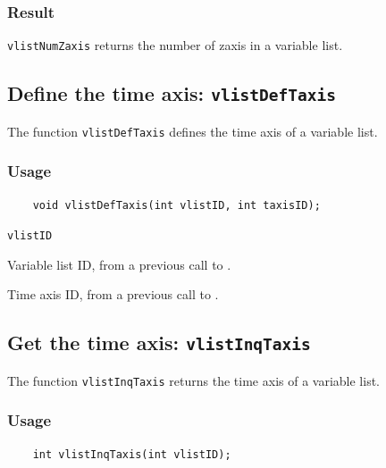 \subsubsection*{Result}

{\texttt{vlistNumZaxis}} returns the number of zaxis in a variable list.



\subsection{Define the time axis: \texttt{vlistDefTaxis}}
\label{vlistDefTaxis}

The function {\texttt{vlistDefTaxis}} defines the time axis of a variable list.

\subsubsection*{Usage}

\begin{verbatim}
    void vlistDefTaxis(int vlistID, int taxisID);
\end{verbatim}

\hspace*{4mm}\begin{minipage}[]{15cm}
\begin{deflist}{\texttt{vlistID}\ }
\item[\texttt{vlistID}]
Variable list ID, from a previous call to {}.
\item[\texttt{taxisID}]
Time axis ID, from a previous call to {}.

\end{deflist}
\end{minipage}


\subsection{Get the time axis: \texttt{vlistInqTaxis}}
\label{vlistInqTaxis}

The function {\texttt{vlistInqTaxis}} returns the time axis of a variable list.

\subsubsection*{Usage}

\begin{verbatim}
    int vlistInqTaxis(int vlistID);
\end{verbatim}

